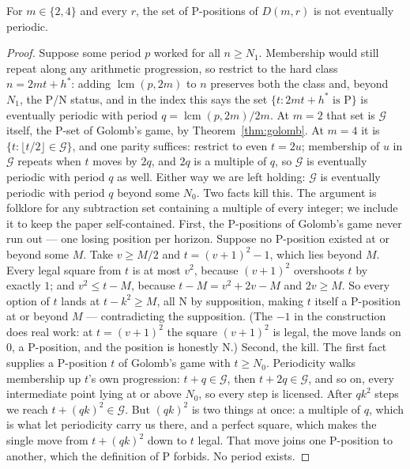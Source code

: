 \begin{corollary}\label{cor:aperiodic}
For $m \in \{2, 4\}$ and every $r$, the set of P-positions of $D(m,r)$
is not eventually periodic.
\end{corollary}
\begin{proof}
Suppose some period $p$ worked for all $n \ge N_1$. Membership would
still repeat along any arithmetic progression, so restrict to the hard
class $n = 2mt + h^*$: adding $\operatorname{lcm}(p, 2m)$ to $n$ preserves
both the class and, beyond $N_1$, the P/N status, and in the index this
says the set $\{t : 2mt + h^* \text{ is P}\}$ is eventually periodic with
period $q = \operatorname{lcm}(p, 2m)/2m$. At $m = 2$ that set is $\mathcal{G}$
itself, the P-set of Golomb's game, by Theorem~\ref{thm:golomb}. At
$m = 4$ it is $\{t : \lfloor t/2 \rfloor \in \mathcal{G}\}$, and one parity
suffices: restrict to even $t = 2u$; membership of $u$ in $\mathcal{G}$ repeats
when $t$ moves by $2q$, and $2q$ is a multiple of $q$, so $\mathcal{G}$ is
eventually periodic with period $q$ as well. Either way we are left
holding: $\mathcal{G}$ is eventually periodic with period $q$ beyond some $N_0$.
Two facts kill this. The argument is folklore for any subtraction set
containing a multiple of every integer; we include it to keep the paper
self-contained.
First, the P-positions of Golomb's game never run out --- one losing
position per horizon. Suppose no P-position existed at or beyond some
$M$. Take $v \ge M/2$ and $t = (v+1)^2 - 1$, which lies beyond $M$.
Every legal square from $t$ is at most $v^2$, because $(v+1)^2$
overshoots $t$ by exactly $1$; and $v^2 \le t - M$, because
$t - M = v^2 + 2v - M$ and $2v \ge M$. So every option of $t$ lands at
$t - k^2 \ge M$, all N by supposition, making $t$ itself a P-position at
or beyond $M$ --- contradicting the supposition. (The $-1$ in the
construction does real work: at $t = (v+1)^2$ the square $(v+1)^2$ is
legal, the move lands on $0$, a P-position, and the position is honestly
N.)
Second, the kill. The first fact supplies a P-position $t$ of Golomb's
game with $t \ge N_0$. Periodicity walks membership up $t$'s own
progression: $t + q \in \mathcal{G}$, then $t + 2q \in \mathcal{G}$, and so on, every
intermediate point lying at or above $N_0$, so every step is licensed.
After $q k^2$ steps we reach $t + (qk)^2 \in \mathcal{G}$. But $(qk)^2$ is two
things at once: a multiple of $q$, which is what let periodicity carry
us there, and a perfect square, which makes the single move from
$t + (qk)^2$ down to $t$ legal. That move joins one P-position to
another, which the definition of P forbids. No period exists.
\end{proof}

